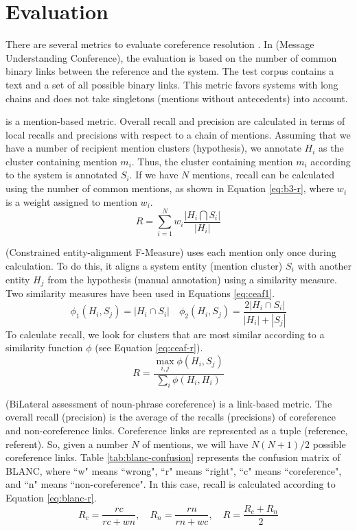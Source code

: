 \documentclass{KBook}
\begin{document}
\section{Evaluation}

There are several metrics to evaluate coreference resolution \cite{2016-moosavi-strube}.
In  (Message Understanding Conference), the evaluation is based on the number of common binary links between the reference and the system.
The test corpus contains a text and a set of all possible binary links.
This metric favors systems with long chains and does not take singletons (mentions without antecedents) into account.

 is a mention-based metric. Overall recall and precision are calculated in terms of local recalls and precisions with respect to a chain of mentions. Assuming that we have a number of recipient mention clusters (hypothesis), we annotate $H_i$ as the cluster containing mention $m_i$.
Thus, the cluster containing mention $m_i$ according to the system is annotated $S_i$.
If we have $N$ mentions, recall can be calculated using the number of common mentions, as shown in Equation \ref{eq:b3-r}, where $w_i$ is a weight assigned to mention $w_i$.
\begin{equation}\label{eq:b3-r}
	R = \sum_{i=1}^{N} w_i \frac{|H_i \bigcap S_i|}{|H_i|}
\end{equation}


 (Constrained entity-alignment F-Measure) uses each mention only once during calculation. To do this, it aligns a system entity (mention cluster) $S_i$ with another entity $H_j$ from the hypothesis (manual annotation) using a similarity measure. Two similarity measures have been used in Equations \ref{eq:ceaf1}.
\begin{equation}\label{eq:ceaf1}
	\phi_1(H_i, S_j) = |H_i \cap S_i | \quad \phi_2(H_i, S_j) = \frac{2|H_i \cap S_i | }{|H_i| + |S_j|}
\end{equation}
To calculate recall, we look for clusters that are most similar according to a similarity function $\phi$ (see Equation \ref{eq:ceaf-r}).
\begin{equation}\label{eq:ceaf-r}
	R = \frac{\max_{i,j} \phi(H_i, S_j)}{\sum_i \phi(H_i, H_i)}
\end{equation}


 (BiLateral assessment of noun-phrase coreference) is a link-based metric. The overall recall (precision) is the average of the recalls (precisions) of coreference and non-coreference links. Coreference links are represented as a tuple (reference, referent). So, given a number $N$ of mentions, we will have $N (N+1)/2$ possible coreference links. Table \ref{tab:blanc-confusion} represents the confusion matrix of BLANC, where ``w" means ``wrong", ``r" means ``right", ``c" means ``coreference", and ``n" means ``non-coreference". In this case, recall is calculated according to Equation \ref{eq:blanc-r}.
\begin{equation}\label{eq:blanc-r}
	R_c = \frac{rc}{rc+wn},\quad R_n = \frac{rn}{rn+wc},\quad R = \frac{R_c + R_n}{2}
\end{equation}
\end{document}
